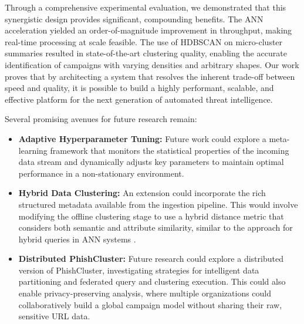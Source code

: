 \documentclass[journal,article,submit,pdftex,moreauthors]{Definitions/mdpi}
\begin{document}
Through a comprehensive experimental evaluation, we demonstrated that this synergistic design provides significant, compounding benefits. The ANN acceleration yielded an order-of-magnitude improvement in throughput, making real-time processing at scale feasible. The use of HDBSCAN on micro-cluster summaries resulted in state-of-the-art clustering quality, enabling the accurate identification of campaigns with varying densities and arbitrary shapes. Our work proves that by architecting a system that resolves the inherent trade-off between speed and quality, it is possible to build a highly performant, scalable, and effective platform for the next generation of automated threat intelligence.

Several promising avenues for future research remain:
\begin{itemize}
    \item \textbf{Adaptive Hyperparameter Tuning:} Future work could explore a meta-learning framework that monitors the statistical properties of the incoming data stream and dynamically adjusts key parameters to maintain optimal performance in a non-stationary environment.
    \item \textbf{Hybrid Data Clustering:} An extension could incorporate the rich structured metadata available from the ingestion pipeline. This would involve modifying the offline clustering stage to use a hybrid distance metric that considers both semantic and attribute similarity, similar to the approach for hybrid queries in ANN systems \cite{ref_wang_nhq}.
    \item \textbf{Distributed PhishCluster:} Future research could explore a distributed version of PhishCluster, investigating strategies for intelligent data partitioning and federated query and clustering execution. This could also enable privacy-preserving analysis, where multiple organizations could collaboratively build a global campaign model without sharing their raw, sensitive URL data.
\end{itemize}
\end{document}
